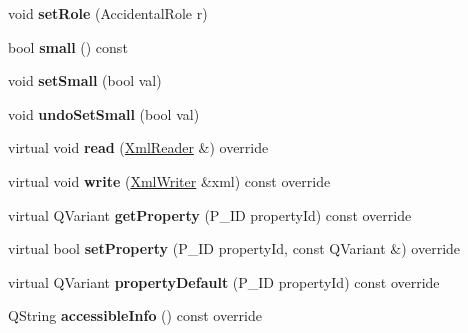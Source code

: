\begin{DoxyCompactItemize}
void {\bfseries set\+Role} (Accidental\+Role r)
\item 
\mbox{\label{class_ms_1_1_accidental_ad8bdad5fdebee0c653855a921c3e87e6}} 
bool {\bfseries small} () const
\item 
\mbox{\label{class_ms_1_1_accidental_a6ee96c8af07d236756703c40c3b7451e}} 
void {\bfseries set\+Small} (bool val)
\item 
\mbox{\label{class_ms_1_1_accidental_a2323642a86385e7efd123d05348b4575}} 
void {\bfseries undo\+Set\+Small} (bool val)
\item 
\mbox{\label{class_ms_1_1_accidental_a279ee592d80933194a0f07e9c06eca58}} 
virtual void {\bfseries read} (\hyperlink{class_ms_1_1_xml_reader}{Xml\+Reader} \&) override
\item 
\mbox{\label{class_ms_1_1_accidental_a4cece4d121413f1fb9ddf02d9c6f3d54}} 
virtual void {\bfseries write} (\hyperlink{class_ms_1_1_xml_writer}{Xml\+Writer} \&xml) const override
\item 
\mbox{\label{class_ms_1_1_accidental_aaf822d2e56f9709ebd1fd3afc0a3d393}} 
virtual Q\+Variant {\bfseries get\+Property} (P\+\_\+\+ID property\+Id) const override
\item 
\mbox{\label{class_ms_1_1_accidental_af8090959605042994ea4e5821ce4547e}} 
virtual bool {\bfseries set\+Property} (P\+\_\+\+ID property\+Id, const Q\+Variant \&) override
\item 
\mbox{\label{class_ms_1_1_accidental_a3fc041b437e2924b491fa6b138ad0beb}} 
virtual Q\+Variant {\bfseries property\+Default} (P\+\_\+\+ID property\+Id) const override
\item 
\mbox{\label{class_ms_1_1_accidental_a36d90369f19c07cba3af82f9f83c283b}} 
Q\+String {\bfseries accessible\+Info} () const override
\end{DoxyCompactItemize}
